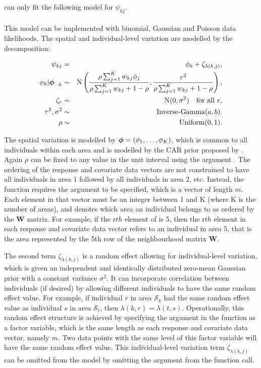 \documentclass[article,shortnames,nojss]{jss}
\newcommand{\bd}[1]{\ensuremath{\mbox{\boldmath $#1$}}}
\begin{document}
 can only fit the following model for $\psi_{kj}$.\\



\\
This model can be implemented with binomial, Gaussian and Poisson data likelihoods. The spatial and individual-level variation are modelled by the decomposition:

\begin{eqnarray}
\psi_{kj}&=&\phi_k + \zeta_{\lambda(k,j)},\label{multilevel}\\
\phi_{k}|\bd{\phi}_{-k}&\sim&\mbox{N}\left(\frac{\rho\sum_{j=1}^{K}w_{kj}\phi_{j}}{\rho\sum_{j=1}^{K}w_{kj} + 1-\rho},\frac{\tau^{2}}{\rho\sum_{j=1}^{K}w_{kj} + 1-\rho}\right),\nonumber\\
 \zeta_{r}&\sim&\mbox{N}(0, \sigma^2)~~~\mbox{for all $r$},\nonumber\\
\tau^2,\sigma^2&\sim&\mbox{Inverse-Gamma}(a,b).\nonumber\\
\rho&\sim&\mbox{Uniform}(0,1).\nonumber
\end{eqnarray}

The spatial variation is modelled by $\bd{\phi}=(\phi_1,\ldots,\phi_K)$, which is common to all individuals within each area and  is modelled by the CAR prior proposed by \cite{leroux2000}. Again $\rho$ can be fixed to any value in the unit interval using the argument . The ordering of the response and covariate data vectors are not constrained to have all individuals in area 1 followed by all individuals in area 2, etc. Instead, the  function requires the  argument to be specified, which is a vector of length $m$. Each element in that vector must be an integer between 1 and K (where K is the number of areas), and denotes which area an individual belongs to as ordered by the $\mathbf{W}$ matrix. For example, if the r$th$ element of   is 5, then the r$th$ element in each response and covariate data vector refers to an individual in area 5, that is the area represented by the 5th row of the neighbourhood matrix $\mathbf{W}$.

\hspace{1cm} The second term  $\zeta_{\lambda(k,j)}$ is a random effect allowing for individual-level variation, which is given an independent and identically distributed zero-mean Gaussian prior with  a constant variance $\sigma^2$. It can incorporate correlation between individuals (if desired) by allowing different individuals to have the same random effect value. For example, if individual $r$ in area $\mathcal{S}_{k}$ had the same random effect value as individual $s$ in area $\mathcal{S}_{t}$, then $\lambda(k,r)=\lambda(t,s)$. Operationally, this random effect structure is achieved by specifying the  argument in the  function as a factor variable, which is the same length as each response and covariate data vector, namely $m$.  Two data points with the same level of this factor variable will have the same random effect value. This individual-level variation term $\zeta_{\lambda(k,j)}$ can be omitted from the model by omitting the  argument from the  function call. 
\end{document}
